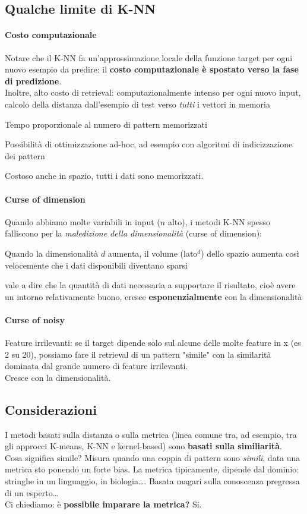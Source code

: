 \documentclass[10pt]{book}
\begin{document}
\subsection{Qualche limite di K-NN}
\paragraph{Costo computazionale} Notare che il K-NN fa un'approssimazione locale della funzione target per ogni nuovo esempio da predire: il \textbf{costo computazionale è spostato verso la fase di predizione}.\\
Inoltre, alto costo di retrieval: computazionalmente intenso per ogni nuovo input, calcolo della distanza dall'esempio di test verso \textit{tutti} i vettori in memoria
\begin{list}{}{}
	\item Tempo proporzionale al numero di pattern memorizzati
	\item Possibilità di ottimizzazione ad-hoc, ad esempio con algoritmi di indicizzazione dei pattern
\end{list}
Costoso anche in spazio, tutti i dati sono memorizzati.
\paragraph{Curse of dimension} Quando abbiamo molte variabili in input ($n$ alto), i metodi K-NN spesso falliscono per la \textit{maledizione della dimensionalità} (curse of dimension):
\begin{list}{}{}
	\item Quando la dimensionalità $d$ aumenta, il volume (lato$^d$) dello spazio aumenta così velocemente che i dati disponibili diventano sparsi
	\item vale a dire che la quantità di dati necessaria a supportare il risultato, cioè avere un intorno relativamente buono, cresce \textbf{esponenzialmente} con la dimensionalità
\end{list}
\paragraph{Curse of noisy} Feature irrilevanti: se il target dipende solo sul alcune delle molte feature in x (es 2 su 20), possiamo fare il retrieval di un pattern "simile" con la similarità dominata dal grande numero di feature irrilevanti.\\
Cresce con la dimensionalità.
\subsection{Considerazioni} I metodi basati sulla distanza o sulla metrica (linea comune tra, ad esempio, tra gli approcci K-means, K-NN e kernel-based) sono \textbf{basati sulla similiarità}.\\
Cosa significa simile? Misura quando una coppia di pattern sono \textit{simili}, data una metrica sto ponendo un forte bias. La metrica tipicamente, dipende dal dominio: stringhe in un linguaggio, in biologia\ldots. Basata magari sulla conoscenza pregressa di un esperto\ldots\\
Ci chiediamo: è \textbf{possibile imparare la metrica?} Si.
\end{document}
